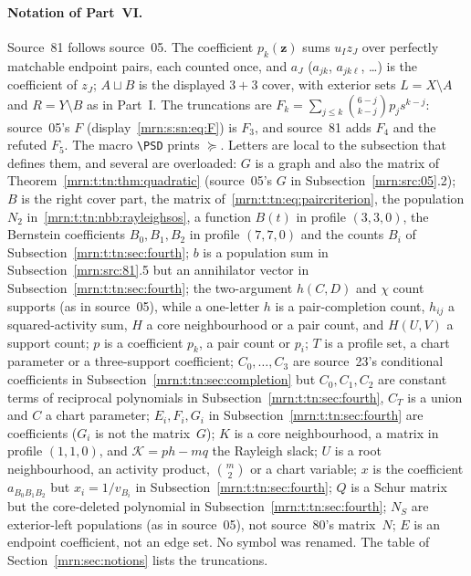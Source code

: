\documentclass[11pt,a4paper]{article}
\theoremstyle{remark}\newtheorem{remark}[theorem]{Remark}
\newcommand{\PSD}{\succeq}                 %
\begin{document}
\paragraph{Notation of Part~VI.}
Source~81 follows source~05. The coefficient $p_k(\mathbf z)$ sums $u_Iz_J$
over perfectly matchable endpoint pairs, each counted once, and $a_J$
($a_{jk}$, $a_{jk\ell}$, \dots) is the coefficient of $z_J$; $A\sqcup B$ is
the displayed $3+3$ cover, with exterior sets $L=X\setminus A$ and
$R=Y\setminus B$ as in Part~I. The truncations are
$F_k=\sum_{j\le k}\binom{6-j}{k-j}p_js^{k-j}$: source~05's $F$
(display~\eqref{mrn:s:sn:eq:F}) is $F_3$, and source~81 adds $F_4$ and the
refuted $F_5$. The macro \verb|\PSD| prints $\PSD$. Letters are local to the
subsection that defines them, and several are overloaded:
$G$ is a graph and also the matrix of Theorem~\ref{mrn:t:tn:thm:quadratic}
(source~05's $G$ in Subsection~\ref{mrn:src:05}.2);
$B$ is the right cover part, the matrix of~\eqref{mrn:t:tn:eq:paircriterion},
the population $N_2$ in~\eqref{mrn:t:tn:nbb:rayleighsos}, a function $B(t)$
in profile $(3,3,0)$, the Bernstein coefficients $B_0,B_1,B_2$ in profile
$(7,7,0)$ and the counts $B_i$ of Subsection~\ref{mrn:t:tn:sec:fourth}; $b$ is
a population sum in Subsection~\ref{mrn:src:81}.5 but an annihilator vector in
Subsection~\ref{mrn:t:tn:sec:fourth}; the two-argument $h(C,D)$ and $\chi$
count supports (as in source~05), while a one-letter $h$ is a pair-completion
count, $h_{ij}$ a squared-activity sum, $H$ a core neighbourhood or a pair
count, and $H(U,V)$ a support count; $p$ is a coefficient $p_k$, a pair count
or $p_i$; $T$ is a profile set, a chart parameter or a three-support
coefficient; $C_0,\dots,C_3$ are source~23's conditional coefficients in
Subsection~\ref{mrn:t:tn:sec:completion} but $C_0,C_1,C_2$ are constant terms
of reciprocal polynomials in Subsection~\ref{mrn:t:tn:sec:fourth}, $C_T$ is a
union and $C$ a chart parameter; $E_i,F_i,G_i$ in
Subsection~\ref{mrn:t:tn:sec:fourth} are coefficients ($G_i$ is not the
matrix~$G$); $K$ is a core neighbourhood, a matrix in profile $(1,1,0)$, and
$\mathcal K=ph-mq$ the Rayleigh slack; $U$ is a root neighbourhood, an
activity product, $\binom m2$ or a chart variable; $x$ is the coefficient
$a_{B_0B_1B_2}$ but $x_i=1/v_{B_i}$ in Subsection~\ref{mrn:t:tn:sec:fourth};
$Q$ is a Schur matrix but the core-deleted polynomial in
Subsection~\ref{mrn:t:tn:sec:fourth}; $N_S$ are exterior-left populations (as
in source~05), not source~80's matrix~$N$; $E$ is an endpoint coefficient, not
an edge set. No symbol was renamed. The table of
Section~\ref{mrn:sec:notions} lists the truncations.
\end{document}
